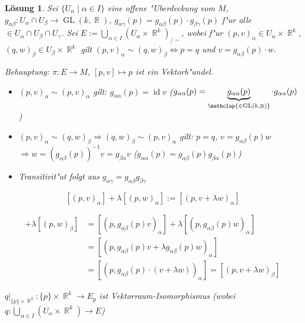 \documentclass[paper=A4, twoside, chapterprefix=true, bibliography=totoc, headsepline]{scrbook}
\DeclareMathOperator{\R}{\mathbb{R}}
\DeclareMathOperator{\GL}{GL} %
\DeclareMathOperator{\Id}{id} %
\newcommand{\X}{\times}
\theoremstyle{plain}
\theoremstyle{nonumberplain}
\theoremstyle{empty}
\theoremstyle{break}
\newtheorem{Loes}{L\"osung}
\newcommand{\quot}[1]{\textrm{\glqq}{#1}\textrm{\grqq}}
\begin{document}
\begin{Loes}
Sei $\{U_\alpha \mid \alpha \in I\}$ eine offene "Uberdeckung vom $M$, $g_{\alpha\beta}: U_\alpha \cap U_\beta \to \GL(k,\R)$, $g_{\alpha\gamma}(p) = g_{\alpha\beta}(p) \cdot g_{\beta\gamma}(p)$ f"ur alle $ \in U_\alpha \cap U_\beta \cap U_\gamma$. Sei $E := \dot\bigcup_{\alpha \in I} (U_\alpha \X \R^k)_{/\sim}$, wobei f"ur $(p,v)_\alpha \in U_\alpha \X \R^k$, $(q,w)_\beta \in U_\beta \X \R^k$ gilt $(p,v)_\alpha \sim (q,w)_\beta \Leftrightarrow p=q$ und $v = g_{\alpha\beta}(p) \cdot w$.

\emph{Behauptung:} $\pi: E \to M$, $[p,v] \mapsto p$ ist ein Vektorb"undel.

\begin{description}[leftmargin=*]
\item[\quot{$\bm{\sim}$} ist "Aquivalenzrelation:]\begin{itemize}[leftmargin=*]
	\item
		$(p,v)_\alpha \sim (p,v)_\alpha$ gilt: $g_{\alpha\alpha}(p) = \Id v$ ($g_{\alpha\alpha}(p) = \underbrace{g_{\alpha\alpha}(p)}_{\mathclap{\in \GL(k,\R)}} \cdot g_{\alpha\alpha}(p)$)
	\item
		$(p,v)_\alpha \sim (q,w)_\beta \Rightarrow (q,w)_\beta \sim (p,v)_\alpha$ gilt: $p=q$, $v=g_{\alpha\beta}(p)w$ $\Rightarrow w = (g_{\alpha\beta}(p))^{-1} v = g_{\beta\alpha} v$ ($g_{\alpha\alpha}(p) = g_{\alpha\beta}(p) g_{\beta\alpha}(p)$)
	\item
		Transitivit"at folgt aus $g_{\alpha\gamma} = g_{\alpha\beta} g_{\beta\gamma}$
	\end{itemize}
\item[$\bm{E_p}$ ist $\bm{k}$-dimensionaler Vektorraum:]
	\[ [(p,v)_\alpha] + \lambda[(p,w)_\alpha] := [(p, v + \lambda w)_\alpha] \]
	\begin{description}[font=\normalfont\itshape,leftmargin=*]
	\item[unabh"angig von $\alpha$:]
		\begin{align*}
			[(p,v)_\beta] + \lambda[(p,w)_\beta] &= [(p,g_{\alpha\beta}(p)v)_\alpha] + \lambda[(p,g_{\alpha\beta}(p)w)_\alpha] \\
				&= [(p,g_{\alpha\beta}(p)v + \lambda g_{\alpha\beta}(p)w)_\alpha] \\
				&= [(p,g_{\alpha\beta}(p) \cdot(v + \lambda w))_\alpha] = [(p,v + \lambda w)_\beta]
		\end{align*}
	\item[$k$-dimensional:]
		$q|_{\{p\} \X \R^k} : \{p\} \X \R^k \to E_p$ ist Vektorraum-Isomorphismus (wobei $q: \dot \bigcup_{\alpha \in I} (U_\alpha \X \R^k) \to E$)

\end{description}
\end{description}
\end{Loes}
\end{document}
